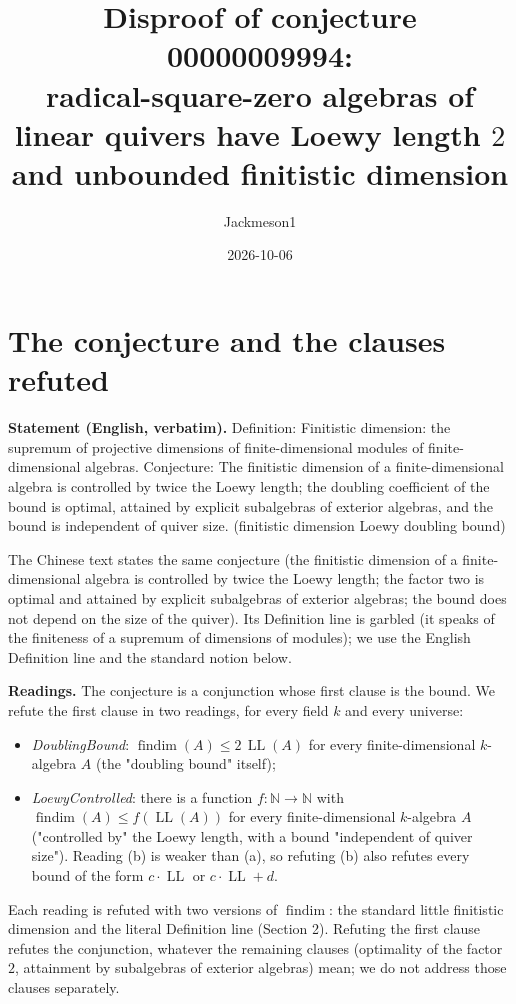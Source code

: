 \documentclass[11pt]{article}
\title{Disproof of conjecture 00000009994:\\ radical-square-zero algebras of linear quivers have
Loewy length $2$ and unbounded finitistic dimension}
\author{Jackmeson1}
\date{2026-10-06}
\theoremstyle{definition}
\newcommand{\fd}{\operatorname{findim}}
\newcommand{\LL}{\operatorname{LL}}
\begin{document}
\maketitle

\section{The conjecture and the clauses refuted}

\textbf{Statement (English, verbatim).} Definition: Finitistic dimension: the supremum of projective
dimensions of finite-dimensional modules of finite-dimensional algebras. Conjecture: The finitistic
dimension of a finite-dimensional algebra is controlled by twice the Loewy length; the doubling
coefficient of the bound is optimal, attained by explicit subalgebras of exterior algebras, and the
bound is independent of quiver size. (finitistic dimension Loewy doubling bound)

The Chinese text states the same conjecture (the finitistic dimension of a finite-dimensional
algebra is controlled by twice the Loewy length; the factor two is optimal and attained by explicit
subalgebras of exterior algebras; the bound does not depend on the size of the quiver). Its
Definition line is garbled (it speaks of the finiteness of a supremum of dimensions of modules); we
use the English Definition line and the standard notion below.

\textbf{Readings.} The conjecture is a conjunction whose first clause is the bound. We refute the
first clause in two readings, for every field $k$ and every universe:
\begin{itemize}
\item[(a)] \emph{DoublingBound}: $\fd(A)\le 2\,\LL(A)$ for every finite-dimensional $k$-algebra $A$
(the "doubling bound" itself);
\item[(b)] \emph{LoewyControlled}: there is a function $f:\mathbb N\to\mathbb N$ with
$\fd(A)\le f(\LL(A))$ for every finite-dimensional $k$-algebra $A$ ("controlled by" the Loewy
length, with a bound "independent of quiver size"). Reading (b) is weaker than (a), so refuting (b)
also refutes every bound of the form $c\cdot\LL$ or $c\cdot\LL+d$.
\end{itemize}
Each reading is refuted with two versions of $\fd$: the standard little finitistic dimension and
the literal Definition line (Section 2). Refuting the first clause refutes the conjunction, whatever
the remaining clauses (optimality of the factor $2$, attainment by subalgebras of exterior algebras)
mean; we do not address those clauses separately.
\end{document}
